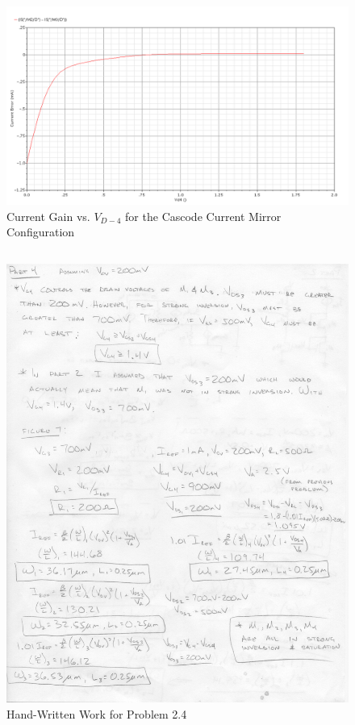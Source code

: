 \documentclass{article}
\begin{document}
\begin{figure}[H]
\centering
\includegraphics[width=6in]{p2_3_2}
\caption{Current Gain vs. $V_{D-4}$ for the Cascode Current Mirror Configuration}
\label{2_3b}
\end{figure}
\newpage

\subsection{}
\begin{figure}[H]
\centering
\includegraphics[width=6in]{1_6}
\caption{Hand-Written Work for Problem 2.4}
\label{2_4}
\end{figure}
\end{document}
